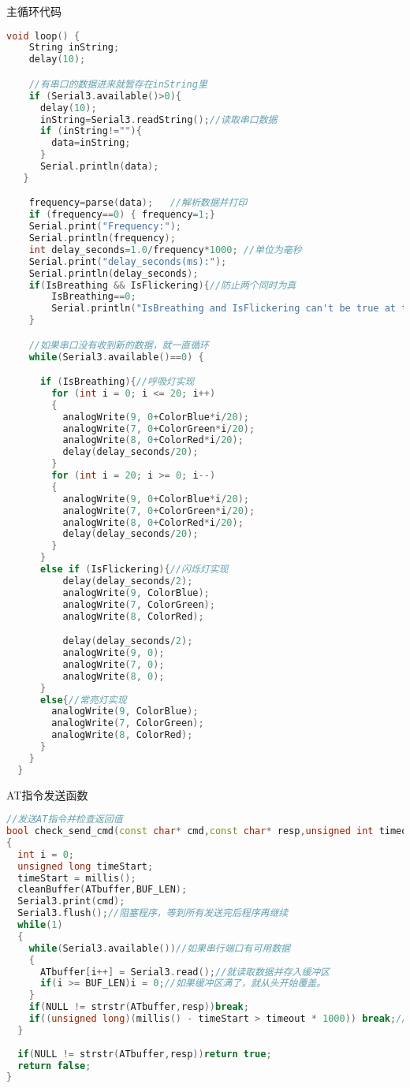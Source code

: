 \documentclass[12pt,hyperref,a4paper,UTF8]{ctexart}
\begin{document}
主循环代码
\begin{lstlisting}[language=C++]
    void loop() {
    String inString;
    delay(10);

    //有串口的数据进来就暂存在inString里
    if (Serial3.available()>0){
      delay(10);
      inString=Serial3.readString();//读取串口数据
      if (inString!=""){
        data=inString;
      }
      Serial.println(data);
   }

    frequency=parse(data);   //解析数据并打印
    if (frequency==0) { frequency=1;}
    Serial.print("Frequency:");
    Serial.println(frequency);  
    int delay_seconds=1.0/frequency*1000; //单位为毫秒
    Serial.print("delay_seconds(ms):");
    Serial.println(delay_seconds);
    if(IsBreathing && IsFlickering){//防止两个同时为真
        IsBreathing==0;
        Serial.println("IsBreathing and IsFlickering can't be true at the same time,set IsBreathing to false");
    }

    //如果串口没有收到新的数据，就一直循环
    while(Serial3.available()==0) {

      if (IsBreathing){//呼吸灯实现
        for (int i = 0; i <= 20; i++)
        {
          analogWrite(9, 0+ColorBlue*i/20);
          analogWrite(7, 0+ColorGreen*i/20);
          analogWrite(8, 0+ColorRed*i/20);
          delay(delay_seconds/20);
        }
        for (int i = 20; i >= 0; i--)
        {
          analogWrite(9, 0+ColorBlue*i/20);
          analogWrite(7, 0+ColorGreen*i/20);
          analogWrite(8, 0+ColorRed*i/20);
          delay(delay_seconds/20);
        }
      }
      else if (IsFlickering){//闪烁灯实现
          delay(delay_seconds/2);
          analogWrite(9, ColorBlue);
          analogWrite(7, ColorGreen);
          analogWrite(8, ColorRed);

          delay(delay_seconds/2);
          analogWrite(9, 0);
          analogWrite(7, 0);
          analogWrite(8, 0);   
      }
      else{//常亮灯实现
        analogWrite(9, ColorBlue);
        analogWrite(7, ColorGreen);
        analogWrite(8, ColorRed);
      }
    }
  }
\end{lstlisting}

AT指令发送函数
\begin{lstlisting}[language=C++]
    //发送AT指令并检查返回值
bool check_send_cmd(const char* cmd,const char* resp,unsigned int timeout)
{
  int i = 0;
  unsigned long timeStart;
  timeStart = millis();
  cleanBuffer(ATbuffer,BUF_LEN);
  Serial3.print(cmd);
  Serial3.flush();//阻塞程序，等到所有发送完后程序再继续
  while(1)
  {
    while(Serial3.available())//如果串行端口有可用数据
    {
      ATbuffer[i++] = Serial3.read();//就读取数据并存入缓冲区
      if(i >= BUF_LEN)i = 0;//如果缓冲区满了，就从头开始覆盖。
    }
    if(NULL != strstr(ATbuffer,resp))break;
    if((unsigned long)(millis() - timeStart > timeout * 1000)) break;//超时
  }
  
  if(NULL != strstr(ATbuffer,resp))return true;
  return false;
}

\end{lstlisting}
\end{document}
